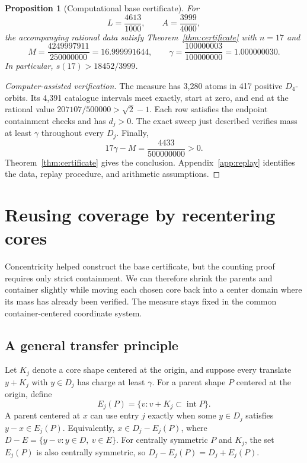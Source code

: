 \documentclass[11pt]{article}
\newtheorem{proposition}[theorem]{Proposition}
\newcommand{\interior}{\operatorname{int}}
\begin{document}
\begin{proposition}[Computational base certificate]\label{prop:base}
For
\[
  L=\frac{4613}{1000},\qquad A=\frac{3999}{4000},
\]
the accompanying rational data satisfy Theorem~\ref{thm:certificate} with
$n=17$ and
\[
  M=\frac{4249997911}{250000000}=16.999991644,
  \qquad
  \gamma=\frac{100000003}{100000000}=1.000000030.
\]
In particular, $s(17)>18452/3999$.
\end{proposition}

\begin{proof}[Computer-assisted verification]
The measure has 3,280 atoms in 417 positive $D_4$-orbits. Its 4,391 catalogue
intervals meet exactly, start at zero, and end at the rational value
$207107/500000>\sqrt2-1$. Each row satisfies the endpoint containment checks
and has $d_j>0$. The exact sweep just described verifies mass at least
$\gamma$ throughout every $D_j$. Finally,
\[
  17\gamma-M=\frac{4433}{500000000}>0.
\]
Theorem~\ref{thm:certificate} gives the conclusion. Appendix~\ref{app:replay}
identifies the data, replay procedure, and arithmetic assumptions.
\end{proof}

\section{Reusing coverage by recentering cores}\label{sec:recenter}

Concentricity helped construct the base certificate, but the counting proof
requires only strict containment. We can therefore shrink the parents and
container slightly while moving each chosen core back into a center domain
where its mass has already been verified. The measure stays fixed in the
common container-centered coordinate system.

\subsection{A general transfer principle}

Let $K_j$ denote a core shape centered at the origin, and suppose every
translate $y+K_j$ with $y\in D_j$ has charge at least $\gamma$. For a parent
shape $P$ centered at the origin, define
\[
  E_j(P)=\{v:v+K_j\subset\interior P\}.
\]
A parent centered at $x$ can use entry $j$ exactly when some $y\in D_j$
satisfies $y-x\in E_j(P)$. Equivalently, $x\in D_j-E_j(P)$, where
$D-E=\{y-v:y\in D,\ v\in E\}$.
For centrally symmetric $P$ and $K_j$, the set $E_j(P)$ is also centrally
symmetric, so $D_j-E_j(P)=D_j+E_j(P)$.
\end{document}
